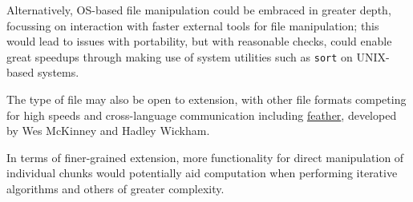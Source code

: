 Alternatively, OS-based file manipulation could be embraced in greater
depth, focussing on interaction with faster external tools for file
manipulation; this would lead to issues with portability, but with
reasonable checks, could enable great speedups through making use of
system utilities such as \texttt{sort} on UNIX-based systems.

The type of file may also be open to extension, with other file formats
competing for high speeds and cross-language communication including
\href{https://github.com/wesm/feather}{feather}, developed by Wes
McKinney and Hadley Wickham\cite{wes16}.

In terms of finer-grained extension, more functionality for direct
manipulation of individual chunks would potentially aid computation when
performing iterative algorithms and others of greater complexity.